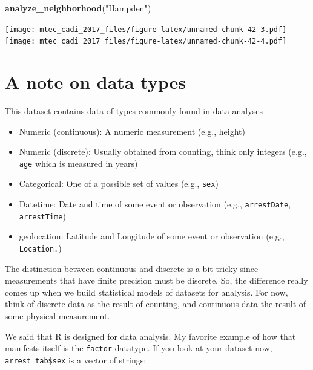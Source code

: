\documentclass[12pt,]{book}
\newenvironment{Shaded}{\begin{snugshade}}{\end{snugshade}}
\newcommand{\KeywordTok}[1]{\textcolor[rgb]{0.13,0.29,0.53}{\textbf{#1}}}
\newcommand{\StringTok}[1]{\textcolor[rgb]{0.31,0.60,0.02}{#1}}
\newcommand{\OperatorTok}[1]{\textcolor[rgb]{0.81,0.36,0.00}{\textbf{#1}}}
\newcommand{\NormalTok}[1]{#1}
\providecommand{\tightlist}{%
  \setlength{\itemsep}{0pt}\setlength{\parskip}{0pt}}
\theoremstyle{definition}
\theoremstyle{definition}
\theoremstyle{remark}
\begin{document}
\begin{Shaded}
\begin{Highlighting}[]
\KeywordTok{analyze_neighborhood}\NormalTok{(}\StringTok{"Hampden"}\NormalTok{)}
\end{Highlighting}
\end{Shaded}

\texttt{[image: mtec\_cadi\_2017\_files/figure-latex/unnamed-chunk-42-3.pdf]}
\texttt{[image: mtec\_cadi\_2017\_files/figure-latex/unnamed-chunk-42-4.pdf]}

\section{A note on data types}\label{a-note-on-data-types}

This dataset contains data of types commonly found in data analyses

\begin{itemize}
\tightlist
\item
  Numeric (continuous): A numeric measurement (e.g., height)\\
\item
  Numeric (discrete): Usually obtained from counting, think only
  integers (e.g., \texttt{age} which is measured in years)\\
\item
  Categorical: One of a possible set of values (e.g., \texttt{sex})\\
\item
  Datetime: Date and time of some event or observation (e.g.,
  \texttt{arrestDate}, \texttt{arrestTime})\\
\item
  geolocation: Latitude and Longitude of some event or observation
  (e.g., \texttt{Location.})
\end{itemize}

The distinction between continuous and discrete is a bit tricky since
measurements that have finite precision must be discrete. So, the
difference really comes up when we build statistical models of datasets
for analysis. For now, think of discrete data as the result of counting,
and continuous data the result of some physical measurement.

We said that R is designed for data analysis. My favorite example of how
that manifests itself is the \texttt{factor} datatype. If you look at
your dataset now, \texttt{arrest\_tab\$sex} is a vector of strings:

\begin{Shaded}
\end{Shaded}
\end{document}
